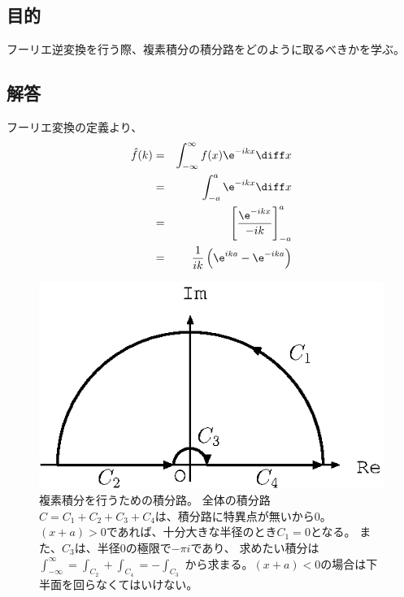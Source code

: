 \subsection{目的}

フーリエ逆変換を行う際、複素積分の積分路をどのように取るべきかを学ぶ。

\subsection{解答}


フーリエ変換の定義より、
\begin{eqnarray}
  \hat{f}(k) &=& \int_{-\infty}^{\infty} f(x) \e^{-ikx} \diff x \\
  &=& \int_{-a}^{a} \e^{-ikx} \diff x \\
  &=& \left[ \frac{\e^{-ikx}}{-ik}  \right]_{-a}^a\\
  &=& \frac{1}{ik} \left( \e^{ika} - \e^{-ika} \right)
\end{eqnarray}

\begin{figure}[htbp]
  \begin{center}
    \includegraphics[width=.5\linewidth]{fig/jordan2.eps}
  \end{center}
  \caption{
    複素積分を行うための積分路。
    全体の積分路$C = C_1+C_2+C_3+C_4$は、積分路に特異点が無いから$0$。
    $(x+a)>0$であれば、十分大きな半径のとき$C_1=0$となる。
    また、$C_3$は、半径$0$の極限で$-\pi i $であり、
    求めたい積分は
    $
      \int_{-\infty}^{\infty} = \int_{C_2}+\int_{C_4} = -\int_{C_3}
    $
    から求まる。$(x+a)<0$の場合は下半面を回らなくてはいけない。
  }
  \label{fig_jordan2}
\end{figure}

